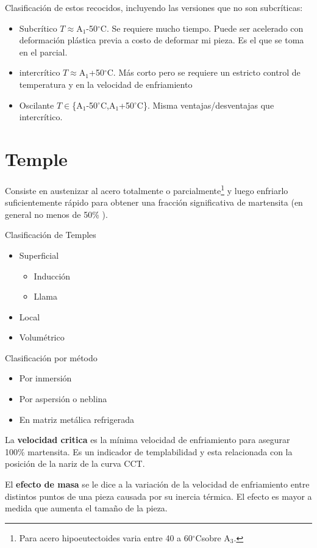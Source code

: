 \documentclass{article}
\newcommand{\Aone}{A\ensuremath{_{1}}}
\newcommand{\Athree}{A\ensuremath{_{3}}}
\newcommand{\grad}{\ensuremath{^\circ \mathrm{C}}}
\begin{document}
Clasificación de estos recocidos, incluyendo las versiones que no son subcríticas:
\begin{itemize}
    \item Subcrítico $T\approx$\Aone-50\grad. Se requiere mucho tiempo. Puede ser acelerado con deformación plástica previa a costo de deformar mi pieza. Es el que se toma en el parcial.
    \item intercrítico $T\approx$\Aone+50\grad. Más corto pero se requiere un estricto control de temperatura y en la velocidad de enfriamiento
    \item Oscilante $T\in$\{\Aone-50\grad,\Aone+50\grad \}. Misma ventajas/desventajas que intercrítico.    
\end{itemize}

\section{Temple}

Consiste en austenizar al acero totalmente o parcialmente\footnote{Para acero hipoeutectoides varia entre 40 a 60\grad sobre \Athree.} y luego enfriarlo suficientemente rápido para obtener una fracción significativa de martensita (en general no menos de 50\% ). 

Clasificación de Temples
\begin{itemize}
    \item Superficial
    \begin{itemize}
        \item Inducción
        \item Llama
    \end{itemize}
    \item Local
    \item Volumétrico
\end{itemize}
Clasificación por método
\begin{itemize}
    \item Por inmersión
    \item Por aspersión o neblina
    \item En matriz metálica refrigerada
\end{itemize}

La \textbf{velocidad critica} es la mínima velocidad de enfriamiento para asegurar 100\% martensita. Es un indicador de templabilidad y esta relacionada con la posición de la nariz de la curva CCT.

El \textbf{efecto de masa} se le dice a la variación de la velocidad de enfriamiento entre distintos puntos de una pieza causada por su inercia térmica. El efecto es mayor a medida que aumenta el tamaño de la pieza.
\end{document}
